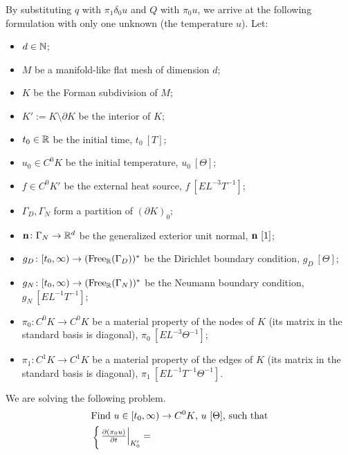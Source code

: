 \begin{formulation}
  \label{idec/discrete_heat_transport/phenomenon-formulation}
  By substituting $q$ with $\pi_1 \delta_0 u$ and $Q$ with $\pi_0 u$,
  we arrive at the following formulation with only one unknown
  (the temperature $u$).
  Let:
  \begin{itemize}
    \item
      $d \in \mathbb{N}$;
    \item
      $M$ be a manifold-like flat mesh of dimension $d$;
    \item
      $K$ be the Forman subdivision of $M$;
    \item
      $K' := K \setminus \partial K$ be the interior of $K$;
    \item
      $t_0 \in \mathbb{R}$ be the initial time, $t_0\ [T]$;
    \item
      $u_0 \in C^0 K$ be the initial temperature, $u_0\ [\Theta]$;
    \item
      $f \in C^0 K'$ be the external heat source, $f\ [E L^{-3} T^{-1}]$;
    \item
      $\Gamma_D, \Gamma_N$ form a partition of $(\partial K)_0$;
    \item
      ${\bf n} \colon \Gamma_N \to \mathbb{R}^d$
      be the generalized exterior unit normal, ${\bf n}\ [1]$;
    \item
      $g_D \colon [t_0, \infty) \to ({\rm Free}_{\mathbb{R}}(\Gamma_D))^*$
      be the Dirichlet boundary condition, $g_D\ [\Theta]$;
    \item
      $g_N \colon [t_0, \infty) \to ({\rm Free}_{\mathbb{R}}(\Gamma_N))^*$
      be the Neumann boundary condition, $g_N\ [E L^{-1} T^{-1}]$;
    \item
      $\pi_0 \colon C^0 K \to C^0 K$ be a material property of the nodes of $K$
      (its matrix in the standard basis is diagonal),
      $\pi_0\ [E L^{-3} \Theta^{-1}]$;
    \item
      $\pi_1 \colon C^1 K \to C^1 K$ be a material property of the edges of $K$
      (its matrix in the standard basis is diagonal),
      $\pi_1\ [E L^{-1} T^{-1} \Theta^{-1}]$.
  \end{itemize}
  We are solving the following problem.
  \begin{equation}
    \begin{split}
      & \text{Find $u \in [t_0, \infty) \to C^0 K$, $u\ [\Theta]$, such that} \\
      &
      \begin{cases}
        \left. \frac{\partial (\pi_0 u)}{\partial t} \right|_{K'_0} =

\end{cases}
\end{split}
\end{equation}
\end{formulation}
